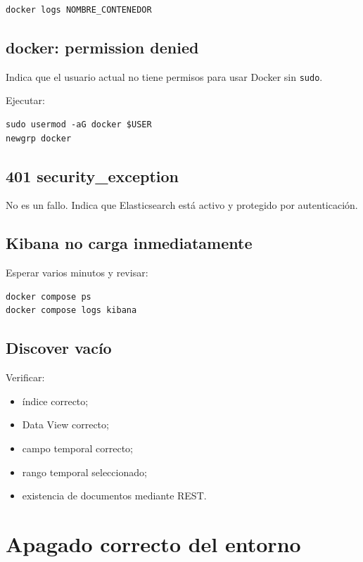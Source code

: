 \documentclass[
  coursetitle={Cómputo Nube y Tecnologías Emergentes},
  coursehours={96},
  coursedate={Verano 2026},
  doctype={Laboratorio},
  otherlangs={english,french},
  authorname={Lázaro},
  authorsurname={Bustio-Martínez},
  authortitle={PhD},
  role={Profesor Investigador},
  email={lbustio@inaoe.mx},
  phone={5559504000},
  ext={7459},
  institution={Instituto Nacional de Astrofísica, Óptica y Electrónica (INAOE)},
  department={Maestría en Ciencias en Tecnologías de Seguridad},
  address={Luis Enrique Erro 1, Sta. Ma. Tonantzintla, San Andrés Cholula, CP 72840, Puebla, México},
  margin={0.5in}
]{../../lbustio_lecture_notes}
\begin{document}
\begin{lstlisting}
docker logs NOMBRE_CONTENEDOR
\end{lstlisting}

\subsection{docker: permission denied}

Indica que el usuario actual no tiene permisos para usar Docker sin \texttt{sudo}.

Ejecutar:

\begin{lstlisting}
sudo usermod -aG docker $USER
newgrp docker
\end{lstlisting}

\subsection{401 security\_exception}

No es un fallo. Indica que Elasticsearch está activo y protegido por autenticación.

\subsection{Kibana no carga inmediatamente}

Esperar varios minutos y revisar:

\begin{lstlisting}
docker compose ps
docker compose logs kibana
\end{lstlisting}

\subsection{Discover vacío}

Verificar:

\begin{itemize}
    \item índice correcto;
    \item Data View correcto;
    \item campo temporal correcto;
    \item rango temporal seleccionado;
    \item existencia de documentos mediante REST.
\end{itemize}

\section{Apagado correcto del entorno}
\end{document}
